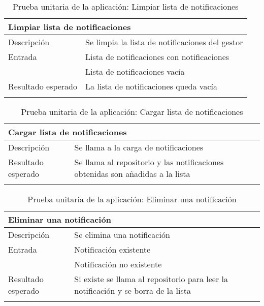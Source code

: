 \begin{longtable}{|p{} p{}|}
    \hline
    \multicolumn{2}{|l|}{\textbf{Limpiar lista de notificaciones}} \\ \hline 
    Descripción                 & Se limpia la lista de notificaciones del gestor \\ \hline
    Entrada                     & Lista de notificaciones con notificaciones \\
                                & Lista de notificaciones vacía \\ \hline
    Resultado esperado          & La lista de notificaciones queda vacía \\ \hline
    \caption{Prueba unitaria de la aplicación: Limpiar lista de notificaciones}
    \label{cp:u:app:limpiar_lista_notificaciones}
\end{longtable}

\vspace{-20pt}
\begin{longtable}{|p{} p{}|}
    \hline
    \multicolumn{2}{|l|}{\textbf{Cargar lista de notificaciones}} \\ \hline 
    Descripción                 & Se llama a la carga de notificaciones \\ \hline
    Resultado esperado          & Se llama al repositorio y las notificaciones obtenidas son añadidas a la lista \\ \hline
    \caption{Prueba unitaria de la aplicación: Cargar lista de notificaciones}
    \label{cp:u:app:cargar_lista_notificaciones}
\end{longtable}

\vspace{-20pt}
\begin{longtable}{|p{} p{}|}
    \hline
    \multicolumn{2}{|l|}{\textbf{Eliminar una notificación}} \\ \hline 
    Descripción                 & Se elimina una notificación \\ \hline
    Entrada                     & Notificación existente \\
                                & Notificación no existente \\ \hline
    Resultado esperado          & Si existe se llama al repositorio para leer la notificación y se borra de la lista \\ \hline
    \caption{Prueba unitaria de la aplicación: Eliminar una notificación}
    \label{cp:u:app:eliminar_notificacion}
\end{longtable}

